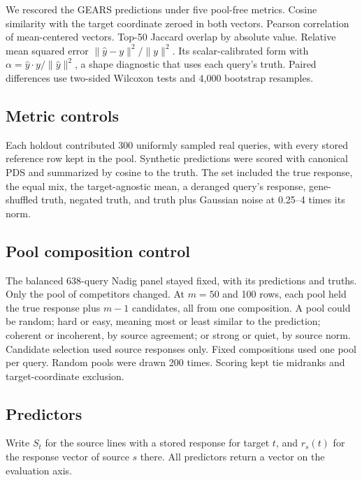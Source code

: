 \documentclass[12pt]{article}
\begin{document}
We rescored the GEARS predictions under five pool-free metrics. Cosine similarity with the target coordinate zeroed in both vectors. Pearson correlation of mean-centered vectors. Top-50 Jaccard overlap by absolute value. Relative mean squared error $\lVert\hat{y}-y\rVert^{2}/\lVert y\rVert^{2}$. Its scalar-calibrated form with $\alpha=\hat{y}\cdot y/\lVert\hat{y}\rVert^{2}$, a shape diagnostic that uses each query's truth. Paired differences use two-sided Wilcoxon tests and 4,000 bootstrap resamples.

\subsection*{Metric controls}

Each holdout contributed 300 uniformly sampled real queries, with every stored reference row kept in the pool. Synthetic predictions were scored with canonical PDS and summarized by cosine to the truth. The set included the true response, the equal mix, the target-agnostic mean, a deranged query's response, gene-shuffled truth, negated truth, and truth plus Gaussian noise at 0.25--4 times its norm.

\subsection*{Pool composition control}

The balanced 638-query Nadig panel stayed fixed, with its predictions and truths. Only the pool of competitors changed. At $m = 50$ and 100 rows, each pool held the true response plus $m-1$ candidates, all from one composition. A pool could be random; hard or easy, meaning most or least similar to the prediction; coherent or incoherent, by source agreement; or strong or quiet, by source norm. Candidate selection used source responses only. Fixed compositions used one pool per query. Random pools were drawn 200 times. Scoring kept tie midranks and target-coordinate exclusion.

\subsection*{Predictors}

Write $S_t$ for the source lines with a stored response for target $t$, and $r_s(t)$ for the response vector of source $s$ there. All predictors return a vector on the evaluation axis.
\end{document}
